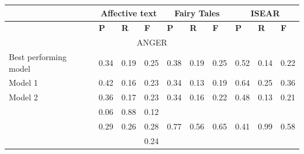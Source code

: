 \documentclass[
10pt, %
a4paper, %
oneside, %
headinclude,footinclude, %
BCOR5mm, %
]{scrartcl}
\begin{document}
\begin{table}[!htbp]
\centering

\begin{tabular}{|l|l|l|l|l|l|l|l|l|l|}
\hline
    & 
    \multicolumn{3}{|c|}{{Affective text}} & 
    \multicolumn{3}{|c|}{{Fairy Tales}} & 
    \multicolumn{3}{|c|}{{ISEAR}}  \\
        
\hline
    & 
    \textbf{P} & 
    \textbf{R} & 
    \textbf{F} & 
    \textbf{P} & 
    \textbf{R} & 
    \textbf{F} & 
    \textbf{P} & 
    \textbf{R} & 
    \textbf{F} \\ 
     
\hline                      
    \multicolumn{10}{|c|}{{ ANGER}} \\                 
                                         
\hline
    \tiny{Best performing model} & 
    \footnotesize{0.34} & 
    \footnotesize{0.19} & 
    \footnotesize{0.25} & 
    \footnotesize{0.38} & 
    \footnotesize{0.19} & 
    \footnotesize{0.25} & 
    \footnotesize{0.52} & 
    \footnotesize{0.14} & 
    \footnotesize{0.22} \\ 

\hline
    \tiny{Model 1} & 
    \footnotesize{0.42} & 
    \footnotesize{0.16} & 
    \footnotesize{0.23} & 
    \footnotesize{0.34} & 
    \footnotesize{0.13} & 
    \footnotesize{0.19} & 
    \footnotesize{0.64} & 
    \footnotesize{0.25} & 
    \footnotesize{0.36} \\ 

\hline
    \tiny{Model 2} & 
    \footnotesize{0.36} & 
    \footnotesize{0.17} & 
    \footnotesize{0.23} & 
    \footnotesize{0.34} & 
    \footnotesize{0.16} & 
    \footnotesize{0.22} & 
    \footnotesize{0.48} & 
    \footnotesize{0.13} & 
    \footnotesize{0.21} \\ 


\hline
    \tiny{\citep{strapparava2008learning} } &
    \footnotesize{0.06} & 
    \footnotesize{0.88} & 
    \footnotesize{0.12} &
    &
    &
    &
    &
    &
    \\

\hline
    \tiny{\citep{kim2010evaluation} } &
    \footnotesize{0.29} & 
    \footnotesize{0.26} & 
    \footnotesize{0.28} &
    \footnotesize{0.77} & 
    \footnotesize{0.56} & 
    \footnotesize{0.65} &
    \footnotesize{0.41} & 
    \footnotesize{0.99} & 
    \footnotesize{0.58} \\
    
\hline
    \tiny{\citep{danisman2008feeler} } &
    \footnotesize{} & 
    \footnotesize{} & 
    \footnotesize{0.24} &
    \footnotesize{} & 
    \footnotesize{} & 
    \footnotesize{} &
    \footnotesize{} & 
    \footnotesize{} & 
    \footnotesize{} \\



\end{tabular}
\end{table}
\end{document}
